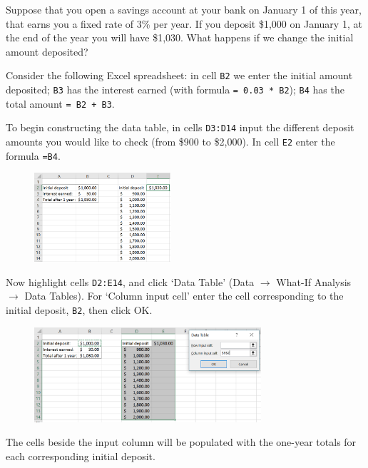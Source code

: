 \begin{myexample}\label{ex:3_datatable}
Suppose that you open a savings account at your bank on January 1 of this year, that earns you a fixed rate of 3\% per year.
If you deposit \$1,000 on January 1, at the end of the year you will have \$1,030.
What happens if we change the initial amount deposited?

Consider the following Excel spreadsheet: in cell \texttt{B2} we enter the initial amount deposited; \texttt{B3} has the interest earned (with formula \texttt{= 0.03 * B2}); \texttt{B4} has the total amount \texttt{= B2 + B3}.

To begin constructing the data table, in cells \texttt{D3:D14} input the different deposit amounts you would like to check (from \$900 to \$2,000).
In cell \texttt{E2} enter the formula \texttt{=B4}.

\begin{figure}[htbp]
	\centering
	\includegraphics[width=0.45\textwidth]{fig/3_datatable_1.png}
	\label{fig:3_datatable_1}
\end{figure}

Now highlight cells \texttt{D2:E14}, and click `Data Table' (Data $\rightarrow$ What-If Analysis $\rightarrow$ Data Tables).
For `Column input cell' enter the cell corresponding to the initial deposit, \texttt{B2}, then click OK.

\begin{figure}[htbp]
	\centering
	\includegraphics[width=0.75\textwidth]{fig/3_datatable_2.png}
	\label{fig:3_datatable_2}
\end{figure}

The cells beside the input column will be populated with the one-year totals for each corresponding initial deposit.


\end{myexample}
